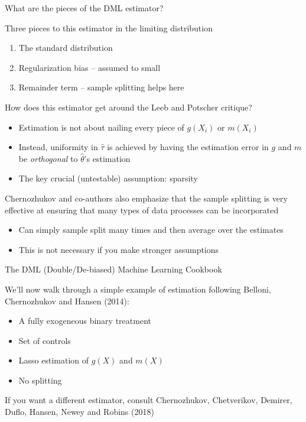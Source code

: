 \documentclass[notes,11pt, aspectratio=169]{beamer}
\newenvironment{wideitemize}{\itemize\addtolength{\itemsep}{10pt}}{\enditemize}
\begin{document}
\begin{frame}{What are the pieces of the DML estimator?}
  \begin{wideitemize}
  \item Three pieces to this estimator in the limiting distribution
    \begin{enumerate}
    \item The standard distribution
    \item Regularization bias -- assumed to small
    \item Remainder term -- sample splitting helps here
    \end{enumerate}
  \item How does this estimator get around the Leeb and Potscher critique?
    \begin{itemize}
    \item Estimation is not about nailing every piece of $g(X_{i})$ or $m(X_{i})$
    \item Instead, uniformity in $\hat{\tau}$ is achieved by having
      the estimation error in $g$ and $m$ be \emph{orthogonal} to
      $\hat{\theta}$'s estimation
    \item The key crucial (untestable) assumption: sparsity
    \end{itemize}
  \item Chernozhukov and co-authors also emphasize that the sample
    splitting is very effective at ensuring that many types of data
    processes can be incorporated
    \begin{itemize}
    \item Can simply sample split many times and then average over the
      estimates
    \item This is not necessary if you make stronger assumptions
    \end{itemize}
\end{wideitemize}
\end{frame}
\begin{frame}{The DML (Double/De-biased) Machine Learning Cookbook}
  \begin{wideitemize}
  \item We'll now walk through a simple example of estimation
    following Belloni, Chernozhukov and Hansen (2014):
    \begin{itemize}
    \item A fully exogeneous binary treatment
    \item Set of controls
    \item Lasso estimation of $g(X)$ and $m(X)$
    \item No splitting
    \end{itemize}
  \item If you want a different estimator, consult
    Chernozhukov, Chetverikov, Demirer, Duflo, Hansen, Newey and
    Robins (2018)
  \end{wideitemize}
\end{frame}
\end{document}

